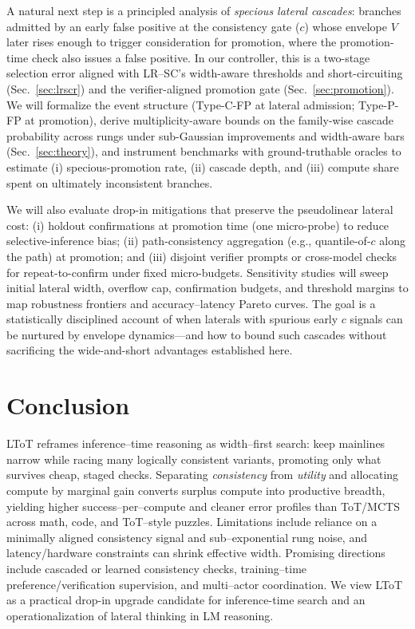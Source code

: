 \documentclass{article}
\begin{document}
A natural next step is a principled analysis of \emph{specious lateral cascades}: branches admitted by an early false positive at the consistency gate (\(c\)) whose envelope \(V\) later rises enough to trigger consideration for promotion, where the promotion-time check also issues a false positive. In our controller, this is a two-stage selection error aligned with LR--SC’s width-aware thresholds and short-circuiting (Sec.~\ref{sec:lrscr}) and the verifier-aligned promotion gate (Sec.~\ref{sec:promotion}). We will formalize the event structure (Type-C-FP at lateral admission; Type-P-FP at promotion), derive multiplicity-aware bounds on the family-wise cascade probability across rungs under sub-Gaussian improvements and width-aware bars (Sec.~\ref{sec:theory}), and instrument benchmarks with ground-truthable oracles to estimate (i) specious-promotion rate, (ii) cascade depth, and (iii) compute share spent on ultimately inconsistent branches.

We will also evaluate drop-in mitigations that preserve the pseudolinear lateral cost: (i) holdout confirmations at promotion time (one micro-probe) to reduce selective-inference bias; (ii) path-consistency aggregation (e.g., quantile-of-\(c\) along the path) at promotion; and (iii) disjoint verifier prompts or cross-model checks for repeat-to-confirm under fixed micro-budgets. Sensitivity studies will sweep initial lateral width, overflow cap, confirmation budgets, and threshold margins to map robustness frontiers and accuracy–latency Pareto curves. The goal is a statistically disciplined account of when laterals with spurious early \(c\) signals can be nurtured by envelope dynamics—and how to bound such cascades without sacrificing the wide-and-short advantages established here.

\section{Conclusion}
\label{section:conclusion}
LToT reframes inference--time reasoning as width--first search: keep mainlines narrow while racing many logically consistent variants, promoting only what survives cheap, staged checks. Separating \emph{consistency} from \emph{utility} and allocating compute by marginal gain converts surplus compute into productive breadth, yielding higher success--per--compute and cleaner error profiles than ToT/MCTS across math, code, and ToT--style puzzles. Limitations include reliance on a minimally aligned consistency signal and sub--exponential rung noise, and latency/hardware constraints can shrink effective width. Promising directions include cascaded or learned consistency checks, training--time preference/verification supervision, and multi--actor coordination. We view LToT as a practical drop-in upgrade candidate for inference-time search and an operationalization of lateral thinking in LM reasoning.
\end{document}
